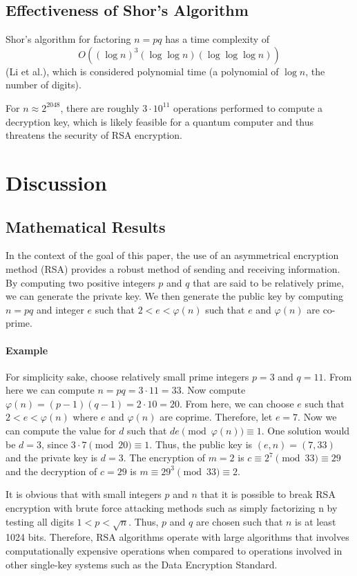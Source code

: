 \documentclass{article}
\begin{document}
\subsection{Effectiveness of Shor's Algorithm}
Shor's algorithm for factoring $n = pq$ has a time complexity of \[O((\log n)^3 (\log \log n)(\log \log \log n))\] (Li et al.), which is considered polynomial time (a polynomial of $\log n$, the number of digits). 

For $n \approx 2^{2048}$, there are roughly $3 \cdot 10^{11}$ operations performed to compute a decryption key, which is likely feasible for a quantum computer and thus threatens the security of RSA encryption.
\section{Discussion}
\subsection{Mathematical Results}

In the context of the goal of this paper, the use of an asymmetrical encryption method (RSA) provides a robust method of sending and receiving information. By computing two positive integers $p$ and $q$ that are said to be relatively prime, we can generate the private key. We then generate the public key by computing $n = pq$ and integer $e$ such that $2 < e < \varphi(n)$ such that $e$ and $\varphi(n)$ are co-prime.

\paragraph{Example} 
For simplicity sake, choose  relatively small prime integers $p = 3$ and $q = 11$. From here we can compute $n = pq = 3\cdot11 = 33$. Now compute $\varphi(n) = (p-1)(q-1) = 2 \cdot 10 = 20$. From here, we can choose $e$ such that $2 < e < \varphi(n)$ where $e$ and $\varphi(n)$ are coprime. Therefore, let $e = 7$. Now we can compute the value for $d$ such that $de \pmod{\varphi(n)} \equiv 1$. One solution would be $d = 3$, since $3 \cdot 7 \pmod{20} \equiv 1$. Thus, the public key is $(e,n) = (7,33) $ and the private key is $d = 3$. The encryption of $m = 2$ is $c \equiv 2^7 \pmod{33} \equiv 29$ and the decryption of $c = 29$ is $m \equiv 29^3 \pmod{33} \equiv 2$.

It is obvious that with small integers $p$ and $n$ that it is possible to break RSA encryption with brute force attacking methods such as simply factorizing n by testing all digits $1 < p < \sqrt{n}$. Thus, $p$ and $q$ are chosen such that $n$ is at least 1024 bits. Therefore, RSA algorithms operate with large algorithms that involves computationally expensive operations when compared to operations involved in other single-key systems such as the Data Encryption Standard.
\end{document}

